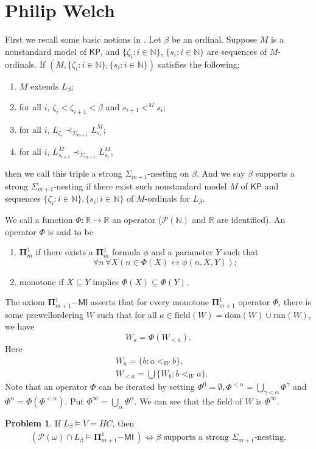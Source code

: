 \documentclass[11pt]{amsart}
\theoremstyle{definition}
\newtheorem{problem}{Problem}[section]
\begin{document}
\section{Philip Welch}
    \quad First we recall some basic notions in \cite{Welch}. Let $\beta$ be an ordinal. Suppose $M$ is a nonstandard model of $\mathsf{KP}$, and $\{\zeta_i:i\in\mathbb{N}\}$, $\{s_i:i\in\mathbb{N}\}$ are sequences of $M$-ordinals. If $\left(M,\{\zeta_i:i\in\mathbb{N}\},\{s_i:i\in\mathbb{N}\}\right)$ satisfies the following:
    \begin{enumerate}
        \item $M$ extends $L_\beta$;
        \item for all $i$, $\zeta_i<\zeta_{i+1}<\beta$ and $s_{i+1}<^Ms_i$;
        \item for all $i$, $L_{\zeta_i}\prec_{\Sigma_{m+1}} L_{s_i}^M$;
        \item for all $i$, $L_{s_{i+1}}^M\prec_{\Sigma_{m-1}} L_{s_i}^M$,
    \end{enumerate}
    then we call this triple a strong $\Sigma_{m+1}$-nesting on $\beta$. And we say $\beta$ supports a strong $\Sigma_{m+1}$-nesting if there exist such nonstandard model $M$ of $\mathsf{KP}$ and sequences $\{\zeta_i:i\in\mathbb{N}\},\{s_i:i\in\mathbb{N}\}$ of $M$-ordinals for $L_\beta$.

    \quad We call a function $\Phi:\mathbb{R}\to\mathbb{R}$ an operator ($\mathcal{P}(\mathbb{N})$ and $\mathbb{R}$ are identified). An operator $\Phi$ is said to be 
    \begin{enumerate}
        \item $\bm{\Pi}_m^1$ if there exists a $\bm{\Pi}_m^1$ formula $\phi$ and a parameter $Y$ such that
        $$\forall n\,\forall X\left(n\in\Phi(X)\leftrightarrow\phi(n,X,Y)\right);$$
        \item monotone if $X\subseteq Y$ implies $\Phi(X)\subseteq\Phi(Y)$.
    \end{enumerate}
    The axiom $\bm{\Pi}_{m+1}^1\mathsf{-MI}$ asserts that for every monotone $\bm{\Pi}_{m+1}^1$ operator $\Phi$, there is some prewellordering $W$ such that for all $a\in\textrm{field}(W)=\textrm{dom}(W)\cup\textrm{ran}(W)$, we have 
    $$W_a=\Phi(W_{<a}).$$
    Here
    \begin{align*}
        &W_a=\{b:a<_Wb\},\\
        &W_{<a}=\bigcup\{W_b:b<_Wa\}.
    \end{align*}
    Note that an operator $\Phi$ can be iterated by setting $\Phi^0=\emptyset, \Phi^{<\alpha}=\bigcup_{\gamma<\alpha}\Phi^\gamma$ and $\Phi^\alpha=\Phi(\Phi^{<\alpha})$. Put $\Phi^\infty=\bigcup_\alpha\Phi^\alpha$. We can see that the field of $W$ is $\Phi^\infty$.
\begin{problem}
    If $L_\beta\models\mbox{$\mathit{V}=\mathit{HC}$}$, then
    \begin{align*}
       \left(\mathcal{P}(\omega)\cap L_\beta\models\bm{\Pi}_{m+1}^1\mathsf{-MI}\,\right)\iff\beta\mbox{ supports a strong }\Sigma_{m+1}\textrm{-nesting}.
    \end{align*}
\end{problem}
\end{document}
